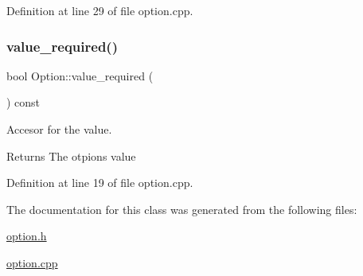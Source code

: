 Definition at line 29 of file option.\+cpp.

\hypertarget{class_option_a5ac713700e6cf3fb87736af5c4388f2a}{}\label{class_option_a5ac713700e6cf3fb87736af5c4388f2a} 
\subsubsection{\texorpdfstring{value\+\_\+required()}{value\_required()}}
{\footnotesize\ttfamily bool Option\+::value\+\_\+required (\begin{DoxyParamCaption}{ }\end{DoxyParamCaption}) const}



Accesor for the value. 

\begin{DoxyReturn}{Returns}
The otpion\textquotesingle{}s value 
\end{DoxyReturn}


Definition at line 19 of file option.\+cpp.



The documentation for this class was generated from the following files\+:\begin{DoxyCompactItemize}
\item 
\hyperlink{option_8h}{option.\+h}\item 
\hyperlink{option_8cpp}{option.\+cpp}\end{DoxyCompactItemize}
